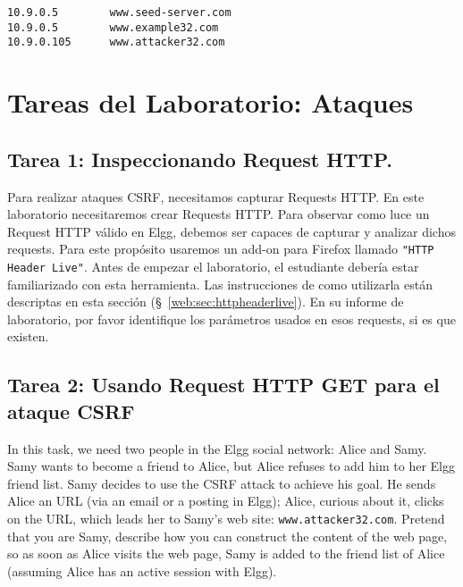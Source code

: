 \begin{lstlisting}
10.9.0.5        www.seed-server.com
10.9.0.5        www.example32.com
10.9.0.105      www.attacker32.com
\end{lstlisting}


\vspace{-0.1in}



\vspace{-0.1in}



\section{Tareas del Laboratorio: Ataques}


\subsection{Tarea 1: Inspeccionando Request HTTP.}

Para realizar ataques CSRF, necesitamos capturar Requests HTTP.
En este laboratorio necesitaremos crear Requests HTTP. 
Para observar como luce un Request HTTP válido en Elgg, debemos ser capaces de capturar y analizar dichos requests.
Para este propósito usaremos un add-on para Firefox llamado \texttt{"HTTP Header Live"}. Antes de empezar el laboratorio, el estudiante debería estar familiarizado con esta herramienta.
Las instrucciones de como utilizarla están descriptas en esta sección (\S~\ref{web:sec:httpheaderlive}). En su informe de laboratorio, por favor identifique los parámetros usados en esos requests, si es que existen.


\subsection{Tarea 2: Usando Request HTTP GET para el ataque CSRF}

In this task, we need two people in the Elgg social network: Alice
and Samy. Samy wants to become a friend to Alice, but Alice refuses to add 
him to her Elgg friend list. Samy decides to use the CSRF attack to
achieve his goal. He sends Alice an URL (via an email or a posting in 
Elgg); Alice, curious about it, clicks on the URL, which leads her to Samy's web site:    
\texttt{www.attacker32.com}. Pretend that you are Samy, describe how you
can construct the content of the web page, so as soon as Alice visits the
web page, Samy is added to the friend list of Alice (assuming Alice has an
active session with Elgg).


